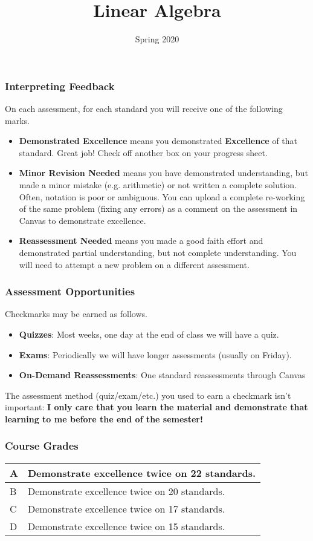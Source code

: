 \documentclass[aspectration=1610]{beamer}
\title{Linear Algebra}
\date{Spring 2020}
\begin{document}
\begin{frame}\frametitle{Interpreting Feedback}
On each assessment, for each standard you will receive one of the following marks.
\begin{itemize}
\item {\bf Demonstrated Excellence} means you demonstrated \textbf{Excellence} of that standard.
      Great job!  Check off another box on your progress sheet.
\item {\bf Minor Revision Needed} means you have demonstrated understanding, but made a minor mistake (e.g. arithmetic) or not written a complete solution.  Often, notation is poor or ambiguous.  You can upload a complete re-working of the same problem (fixing any errors) as a comment on the assessment in Canvas to demonstrate excellence.
\item {\bf Reassessment Needed} means you made a good faith effort and demonstrated
      partial understanding, but not complete understanding. You will need to attempt a new problem on a different assessment. 
\end{itemize}


\end{frame}

\begin{frame}\frametitle{Assessment Opportunities}
Checkmarks may be earned as follows.
\begin{itemize}
\item {\bf Quizzes}: Most weeks, one day at the end of class we will have a quiz. 
\item {\bf Exams}: Periodically we will have longer assessments (usually on Friday).
\item {\bf On-Demand Reassessments}: One standard reassessments through Canvas
\end{itemize}

\pause

\vspace{0.2in}

The assessment method (quiz/exam/etc.) you used to earn a checkmark
isn't important: \textbf{I only care that you
learn the material and demonstrate that learning to me before the end of the
semester!}
\end{frame}




\begin{frame}\frametitle{Course Grades}

\begin{center}
\begin{tabular}{ll} \hline
A & Demonstrate excellence twice on 22 standards.\\ \hline
B &  Demonstrate excellence twice on 20 standards. \\ \hline
C &  Demonstrate excellence twice on 17 standards. \\ \hline
D &   Demonstrate excellence twice on 15 standards. \\ \hline
\end{tabular}
\end{center}

\end{frame}
\end{document}
